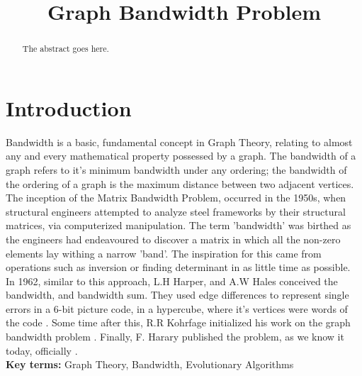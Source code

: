 \documentclass[conference,compsoc]{IEEEtran}
\begin{document}
\title{Graph Bandwidth Problem}

\author{
\and
{}
\and
{}
}

\maketitle

\begin{abstract}
The abstract goes here.
\end{abstract}


\IEEEpeerreviewmaketitle

\section{Introduction}
Bandwidth is a basic, fundamental concept in Graph Theory, relating to almost any and every mathematical property possessed by a graph. The bandwidth of a graph refers to it's minimum bandwidth under any ordering; the bandwidth of the ordering of a graph is the maximum distance between two adjacent vertices.
\\
The inception of the Matrix Bandwidth Problem, occurred in the 1950s, when structural engineers attempted to analyze steel frameworks by their structural matrices, via computerized manipulation. The term 'bandwidth' was birthed as the engineers had endeavoured to discover a matrix in which all the non-zero elements lay withing a narrow 'band'. The inspiration for this came from operations such as inversion or finding determinant in as little time as possible.
\\
In 1962, similar to this approach, L.H Harper, and A.W Hales conceived the bandwidth, and bandwidth sum. They used edge differences to represent single errors in a 6-bit picture code, in a hypercube, where it's vertices were words of the code \cite{10.2307/2946514}. Some time after this, R.R Kohrfage initialized his work on the graph bandwidth problem \cite{ccdg1982}. Finally, F. Harary published the problem, as we know it today, officially \cite{https://doi.org/10.1002/bimj.19660080427}.
\\
\textbf{Key terms:} Graph Theory, Bandwidth, Evolutionary Algorithms
 
\end{document}

